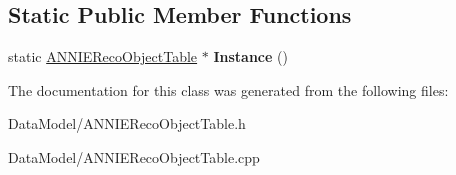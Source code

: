 \subsection*{Static Public Member Functions}
\begin{DoxyCompactItemize}
\item 
\hypertarget{classANNIERecoObjectTable_a2d52c0a9b2ed24f59c97ae6cfff3b1f6}{static \hyperlink{classANNIERecoObjectTable}{A\-N\-N\-I\-E\-Reco\-Object\-Table} $\ast$ {\bfseries Instance} ()}\label{classANNIERecoObjectTable_a2d52c0a9b2ed24f59c97ae6cfff3b1f6}

\end{DoxyCompactItemize}


The documentation for this class was generated from the following files\-:\begin{DoxyCompactItemize}
\item 
Data\-Model/A\-N\-N\-I\-E\-Reco\-Object\-Table.\-h\item 
Data\-Model/A\-N\-N\-I\-E\-Reco\-Object\-Table.\-cpp\end{DoxyCompactItemize}
